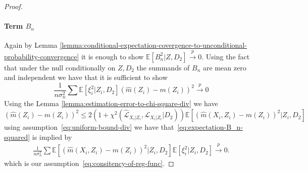 \documentclass[12pt]{article}
\theoremstyle{definition}
\theoremstyle{remark}
\newcommand{\E}{\mathbb E}								%
\newcommand{\srx}{X}									%
\newcommand{\srz}{Z}									%
\newcommand{\law}{\mathcal L}							%
\newcommand{\lawhat}{\widehat{\mathcal L}}				%
\begin{document}
\begin{proof}
	\paragraph{Term $B_n$}
	Again by Lemma \ref{lemma:conditional-expectation-covergence-to-unconditional-probability-convergence} it is enough to show $\E [B_n^2 | \srz,D_2] \overset{p}{\to} 0$. Using the fact  that under the null conditionally on $ \srz,D_2$ the summands of $B_n$ are mean zero and independent we have that it is sufficient to show
	\begin{equation}\label{eq:expectation-B_n-squared}
		\frac{1}{ n\sigma^2_n} \sum \E[ \xi^2_i |\srz_i, D_2] (\widehat m(\srz_i) - m(\srz_i))^2 \overset{p}{\to} 0
	\end{equation}
	Using the Lemma \ref{lemma:estimation-error-to-chi-square-div} we have
	$$
	(\widehat m(\srz_i) -m(\srz_i) )^2 \leq 2\left ( 1 + \chi^2\left(\lawhat_{\srx_i|\srz_i}, \law_{\srx_i|\srz_i} | D_2\right) \right) \E[ (\widehat m (\srx_i,\srz_i) - m(\srz_i))^2|\srz_i, D_2]
	$$
	using assumption~\eqref{eq:uniform-bound-div} we have that~\eqref{eq:expectation-B_n-squared} is implied by 
	\begin{align}\label{eq:B_n-squared-term1}
		\frac{1}{n\sigma_n^2}\sum \E[ (\widehat m (\srx_i,\srz_i) - m(\srz_i))^2|\srz_i, D_2] \E [\xi_i^2|\srz_i,D_2] \overset{p}{\to} 0.
	\end{align}
	which is our assumption~\eqref{eq:consitency-of-reg-func}.

\end{proof}
\end{document}
